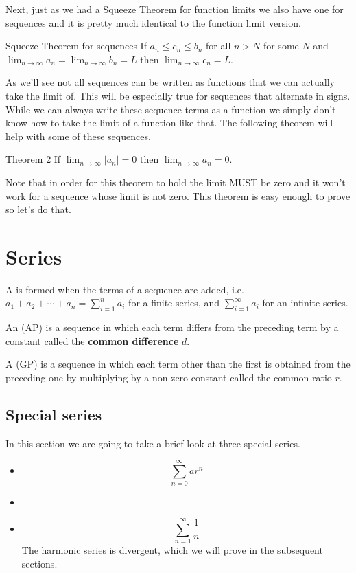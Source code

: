 Next, just as we had a Squeeze Theorem for function limits we also have one for sequences and it is pretty much identical to the function limit version.

\begin{theorem}{Squeeze Theorem for sequences}{}
If $a_n\le c_n\le b_n$ for all $n>N$ for some $N$ and $\lim_{n\to\infty}a_n=\lim_{n\to\infty}b_n=L$ then $\lim_{n\to\infty}c_n=L$.
\end{theorem}

As we’ll see not all sequences can be written as functions that we can actually take the limit of. This will be especially true for sequences that alternate in signs. While we can always write these sequence terms as a function we simply don’t know how to take the limit of a function like that. The following theorem will help with some of these sequences.

Theorem 2
If $\lim_{n\to\infty}|a_n|=0$ then $\lim_{n\to\infty}a_n=0$.

Note that in order for this theorem to hold the limit MUST be zero and it won’t work for a sequence whose limit is not zero. This theorem is easy enough to prove so let’s do that.
\pagebreak

\section{Series}
\begin{definition}
A  is formed when the terms of a sequence are added, i.e. $a_1+a_2+\cdots+a_n=\sum_{i=1}^na_i$ for a finite series, and $\sum_{i=1}^\infty a_i$ for an infinite series.
\end{definition}

An  (AP) is a sequence in which each term differs from the preceding term by a constant called the \textbf{common difference} $d$.

A  (GP) is a sequence in which each term other than the first is obtained from the preceding one by multiplying by a non-zero constant called the common ratio $r$.

\subsection{Special series}
In this section we are going to take a brief look at three special series.
\begin{itemize}
\item {}
\[ \sum_{n=0}^\infty ar^n \]

\item {}

\item {}
\[ \sum_{n=1}^\infty\frac{1}{n} \]
The harmonic series is divergent, which we will prove in the subsequent sections.
\end{itemize}


